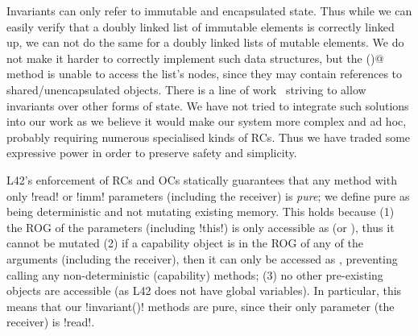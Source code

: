 Invariants can only refer to immutable and encapsulated state. Thus while we can easily verify that a doubly linked list of immutable elements
is correctly linked up,
we can not do the same for a doubly linked lists of mutable elements. We do not make it harder to correctly implement such data structures, 
but the \Q@invariant()@ method is unable to access the list's nodes, since they may contain \Q@mut@ references to shared/unencapsulated objects.
There is a line of work~\cite{DBLP:conf/mpc/BarnettN04} striving to allow invariants over other forms of state.
We have not tried to integrate such solutions into our work as we believe it would make our system more complex and ad hoc, probably requiring numerous specialised kinds of RCs.
Thus we have traded some expressive power in order to preserve safety and simplicity.

\label{s:purity}
L42's enforcement of RCs and OCs statically guarantees that any method with only \Q!read! or \Q!imm! parameters (including the receiver) is \emph{pure}; we define pure
as being deterministic and not mutating existing memory. This holds because
(1) the ROG of the parameters (including \Q!this!) is only accessible as \Q@read@ (or \Q@imm@), thus it cannot be mutated
(2) if a capability object is in the ROG of any of the arguments (including the receiver), then it can only be accessed as \Q@read@, preventing calling any 
non-deterministic (capability) methods;
(3) no other pre-existing objects are accessible (as L42 does not have global variables). 
In particular, this means that our \Q!invariant()! methods are pure, since 
their only parameter (the receiver) is \Q!read!.

